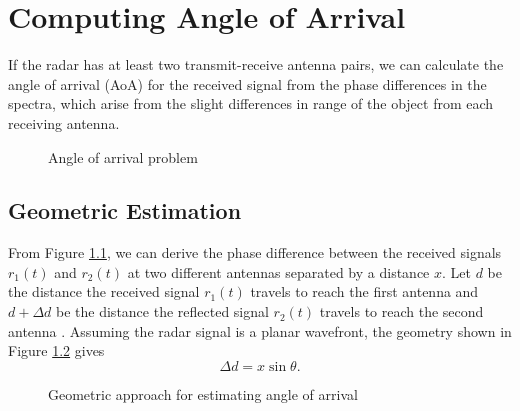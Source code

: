 \chapter{Computing Angle of Arrival}
If the radar has at least two transmit-receive antenna pairs, we can calculate
the angle of arrival (AoA) for the received signal from the
phase differences in the spectra, which arise from the slight differences
in range of the object from each receiving antenna.

\begin{figure}[h]
	\center
	\caption{Angle of arrival problem}
	\label{fig:angle-of-arrival}
\end{figure}

\section{Geometric Estimation}
From Figure \ref{fig:angle-of-arrival}, we can derive the phase difference
between the received signals $r_1(t)$ and $r_2(t)$ at two different antennas
separated by a distance $x$. Let $d$ be the distance the received signal
$r_1(t)$ travels to reach the first antenna and $d + \Delta d$ be the distance
the reflected signal $r_2(t)$ travels to reach the second antenna
\cite{iovescu2017fundamentals}. Assuming the
radar signal is a planar wavefront, the geometry shown in Figure
\ref{fig:geometric-aoa} gives
\begin{equation}
	\Delta d = x \sin \theta. 
\end{equation}
\begin{figure}
	\center
	\caption{Geometric approach for estimating angle of arrival}
	\label{fig:geometric-aoa}
\end{figure}

